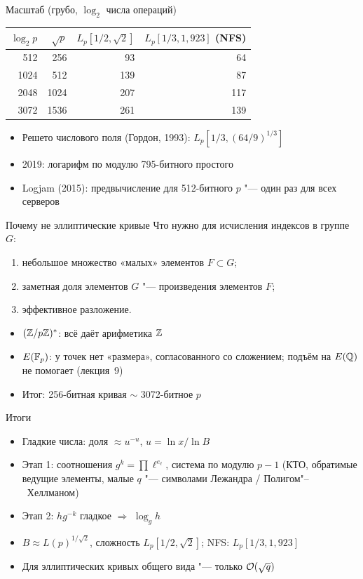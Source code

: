\documentclass{ca-slides}
\begin{document}
\begin{canvasframe}{Масштаб (грубо, $\log_2$ числа операций)}
  \begin{center}
  \begin{tabular}{r|r|r|r}
    $\log_2 p$ & $\sqrt p$ & $L_p[1/2, \sqrt 2]$ & $L_p[1/3, 1{,}923]$ (NFS) \\ \hline
    512 & 256 & 93 & 64 \\
    1024 & 512 & 139 & 87 \\
    2048 & 1024 & 207 & 117 \\
    3072 & 1536 & 261 & 139
  \end{tabular}
  \end{center}
  \begin{itemize}
    \item Решето числового поля (Гордон, 1993): $L_p[1/3, (64/9)^{1/3}]$
    \item 2019: логарифм по модулю 795-битного простого
    \item Logjam (2015): предвычисление для 512-битного $p$ "--- один раз для всех серверов
  \end{itemize}
\end{canvasframe}

\begin{canvasframe}{Почему не эллиптические кривые}
  Что нужно для исчисления индексов в группе $G$:
  \begin{enumerate}
    \item небольшое множество «малых» элементов $F \subset G$;
    \item заметная доля элементов $G$ "--- произведения элементов $F$;
    \item эффективное разложение.
  \end{enumerate}
  \begin{itemize}
    \item $(\mathbb{Z}/p\mathbb{Z})^{*}$: всё даёт арифметика $\mathbb{Z}$
    \item $E(\mathbb{F}_p)$: у точек нет «размера», согласованного со сложением;
      подъём на $E(\mathbb{Q})$ не помогает (лекция~9)
    \item Итог: 256-битная кривая $\sim$ 3072-битное $p$
  \end{itemize}
\end{canvasframe}

\begin{canvasframe}{Итоги}
  \begin{itemize}
    \item Гладкие числа: доля $\approx u^{-u}$, $u = \ln x / \ln B$
    \item Этап 1: соотношения $g^k = \prod \ell^{e_\ell}$, система по модулю $p - 1$ (КТО,
      обратимые ведущие элементы, малые $q$ "--- символами Лежандра / Полигом"--~Хеллманом)
    \item Этап 2: $h g^{-k}$ гладкое $\Rightarrow$ $\log_g h$
    \item $B \approx L(p)^{1/\sqrt 2}$, сложность $L_p[1/2, \sqrt 2]$; NFS: $L_p[1/3, 1{,}923]$
    \item Для эллиптических кривых общего вида "--- только $\mathcal{O}(\sqrt q)$
  \end{itemize}
\end{canvasframe}
\end{document}
